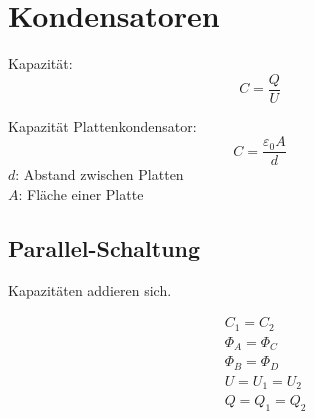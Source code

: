 \section{Kondensatoren}

Kapazität:
\[
	C = \frac{Q}{U}
\]

Kapazität Plattenkondensator:
\[
	C = \frac{\varepsilon_0 A}{d}
\]
$d$: Abstand zwischen Platten\\
$A$: Fläche einer Platte

\subsection{Parallel-Schaltung}

Kapazitäten addieren sich.

\begin{minipage}{.5\linewidth}
	
\end{minipage}
\begin{minipage}{.5\linewidth}
	\begin{align*}
		& C_1 = C_2 \\
		& \Phi_A = \Phi_C \\
		& \Phi_B = \Phi_D \\
		& U = U_1 = U_2 \\
		& Q = Q_1 = Q_2
	\end{align*}
\end{minipage}
